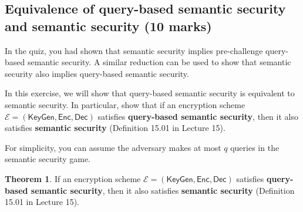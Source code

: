 \documentclass[10pt,addpoints]{exam}
\newcommand{\calE}{\mathcal{E}}
\newcommand{\keygen}{\mathsf{KeyGen}}
\newcommand{\enc}{\mathsf{Enc}}
\newcommand{\dec}{\mathsf{Dec}}
\theoremstyle{definition}
\newtheorem{theorem}{Theorem}[section]
\begin{document}
    \subsection{Equivalence of query-based semantic security and semantic security (10 marks)} 
        In the quiz, you had shown that semantic security implies pre-challenge query-based semantic security. A similar reduction can be used to show that semantic security also implies query-based semantic security. 


        In this exercise, we will show that query-based semantic security is equivalent to semantic security. In  particular, show that if an encryption scheme $\calE = (\keygen, \enc, \dec)$ satisfies \textbf{query-based semantic security}, then it also satisfies \textbf{semantic security} (Definition 15.01 in Lecture 15).  

        \vspace{10pt}

        For simplicity, you can assume the adversary makes at most $q$ queries in the semantic security game. 



        \color{black}

        \begin{theorem}
            If an encryption scheme $\calE = (\keygen, \enc, \dec)$ satisfies \textbf{query-based semantic security}, then it also satisfies \textbf{semantic security} (Definition 15.01 in Lecture 15).
        \end{theorem}
\end{document}
